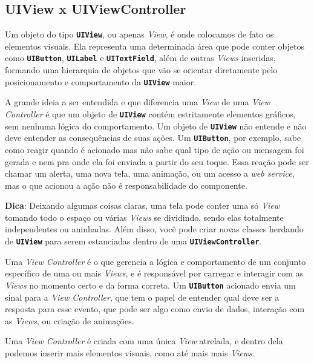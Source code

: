 \documentclass[a4paper,12pt,brazil,doubleside]{book}
\begin{document}
\begin{singlespace}
\subsection{UIView x UIViewController}


Um objeto do tipo \texttt{\textbf{UIView}}, ou apenas \emph{View}, é onde colocamos de fato os elementos visuais. Ela representa uma determinada área que pode conter objetos como \texttt{\textbf{UIButton}}, \texttt{\textbf{UILabel}} e \texttt{\textbf{UITextField}}, além de outras \emph{Views} inseridas, formando uma hierarquia de objetos que vão se orientar diretamente pelo posicionamento e comportamento da \texttt{\textbf{UIView}} maior.

A grande ideia a ser entendida e que diferencia uma \emph{View} de uma \emph{View Controller} é que um objeto de \texttt{\textbf{UIView}} contém estritamente elementos gráficos, sem nenhuma lógica do comportamento. Um objeto de \texttt{\textbf{UIView}} não entende e não deve entender as consequências de suas ações. Um \texttt{\textbf{UIButton}}, por exemplo, sabe como reagir quando é acionado mas não sabe qual tipo de ação ou mensagem foi gerada e nem pra onde ela foi enviada a partir do seu toque. Essa reação pode ser chamar um alerta, uma nova tela, uma animação, ou um acesso a \emph{web service}, mas o que acionou a ação não é responsabilidade do componente.

\begin{framed}

\textbf{Dica}: Deixando algumas coisas claras, uma tela pode conter uma só \emph{View} tomando todo o espaço ou várias \emph{Views} se dividindo, sendo elas totalmente independentes ou aninhadas. Além disso, você pode criar novas classes herdando de \texttt{\textbf{UIView}} para serem estanciadas dentro de uma \texttt{\textbf{UIViewController}}.
\end{framed}


Uma \emph{View Controller} é o que gerencia a lógica e comportamento de um conjunto específico de uma ou mais \emph{Views}, e é responsável por carregar e interagir com as \emph{Views} no momento certo e da forma correta. Um \texttt{\textbf{UIButton}} acionado envia um sinal para a \emph{View Controller}, que tem o papel de entender qual deve ser a resposta para esse evento, que pode ser algo como envio de dados, interação com as \emph{Views}, ou criação de animações.

Uma \emph{View Controller} é criada com uma única \emph{View} atrelada, e dentro dela podemos inserir mais elementos visuais, como até mais mais \emph{Views}.


\end{singlespace}
\end{document}
